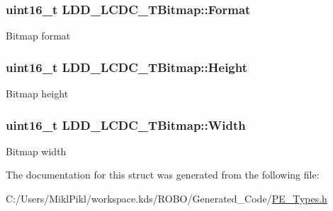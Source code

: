 \subsubsection[{Format}]{\setlength{\rightskip}{0pt plus 5cm}uint16\+\_\+t L\+D\+D\+\_\+\+L\+C\+D\+C\+\_\+\+T\+Bitmap\+::\+Format}\label{struct_l_d_d___l_c_d_c___t_bitmap_a8f886a6ce6e67d4b070c20bdd5ce495a}
Bitmap format \hypertarget{struct_l_d_d___l_c_d_c___t_bitmap_a13fea31674709c4f681e6c86d3b71206}{}
\subsubsection[{Height}]{\setlength{\rightskip}{0pt plus 5cm}uint16\+\_\+t L\+D\+D\+\_\+\+L\+C\+D\+C\+\_\+\+T\+Bitmap\+::\+Height}\label{struct_l_d_d___l_c_d_c___t_bitmap_a13fea31674709c4f681e6c86d3b71206}
Bitmap height \hypertarget{struct_l_d_d___l_c_d_c___t_bitmap_af88017bd29e49292265c1fda6dc5463d}{}
\subsubsection[{Width}]{\setlength{\rightskip}{0pt plus 5cm}uint16\+\_\+t L\+D\+D\+\_\+\+L\+C\+D\+C\+\_\+\+T\+Bitmap\+::\+Width}\label{struct_l_d_d___l_c_d_c___t_bitmap_af88017bd29e49292265c1fda6dc5463d}
Bitmap width 

The documentation for this struct was generated from the following file\+:\begin{DoxyCompactItemize}
\item 
C\+:/\+Users/\+Mikl\+Pikl/workspace.\+kds/\+R\+O\+B\+O/\+Generated\+\_\+\+Code/\hyperlink{_p_e___types_8h}{P\+E\+\_\+\+Types.\+h}\end{DoxyCompactItemize}
